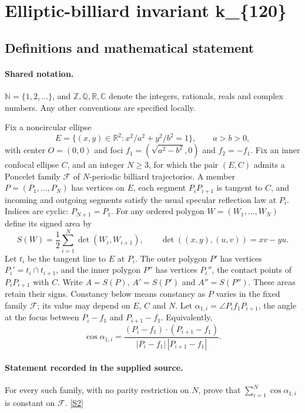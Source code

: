 \documentclass[11pt]{article}
\newcommand{\sref}[2]{\hyperlink{source:#1:#2}{[S#2]}}
\begin{document}
\section{Elliptic-billiard invariant k\_\{120\}}\label{statement}

\subsection{Definitions and mathematical statement}

\paragraph{Shared notation.}$\mathbb N=\{1,2,\ldots\}$, and $\mathbb Z,\mathbb Q,\mathbb R,\mathbb C$ denote the integers, rationals, reals and complex numbers. Any other conventions are specified locally.


Fix a noncircular ellipse
\[
E=\{(x,y)\in\mathbb R^2:x^2/a^2+y^2/b^2=1\},\qquad a>b>0,
\]
with center $O=(0,0)$ and foci $f_1=(\sqrt{a^2-b^2},0)$ and $f_2=-f_1$. Fix an inner confocal ellipse $C$, and an integer $N\geq3$, for which the pair $(E,C)$ admits a Poncelet family $\mathcal F$ of $N$-periodic billiard trajectories. A member $P=(P_1,\ldots,P_N)$ has vertices on $E$, each segment $P_iP_{i+1}$ is tangent to $C$, and incoming and outgoing segments satisfy the usual specular reflection law at $P_i$. Indices are cyclic: $P_{N+1}=P_1$.
For any ordered polygon $W=(W_1,\ldots,W_N)$ define its signed area by
\[
S(W)=\frac12\sum_{i=1}^N\det(W_i,W_{i+1}),\qquad
\det((x,y),(u,v))=xv-yu.
\]
Let $t_i$ be the tangent line to $E$ at $P_i$. The outer polygon $P'$ has vertices $P_i'=t_i\cap t_{i+1}$, and the inner polygon $P''$ has vertices $P_i''$, the contact points of $P_iP_{i+1}$ with $C$. Write $A=S(P)$, $A'=S(P')$ and $A''=S(P'')$. These areas retain their signs. Constancy below means constancy as $P$ varies in the fixed family $\mathcal F$; its value may depend on $E$, $C$ and $N$.
Let $\alpha_{1,i}=\angle P_i f_1 P_{i+1}$, the angle at the focus between $P_i-f_1$ and $P_{i+1}-f_1$. Equivalently,
\[
\cos\alpha_{1,i}=\frac{(P_i-f_1)\cdot(P_{i+1}-f_1)}{|P_i-f_1|\,|P_{i+1}-f_1|}.
\]
\paragraph{Statement recorded in the supplied source.}
For every such family, with no parity restriction on $N$, prove that $\displaystyle\sum_{i=1}^N\cos\alpha_{1,i}$ is constant on $\mathcal F$. \sref{statement}{2}
\end{document}

